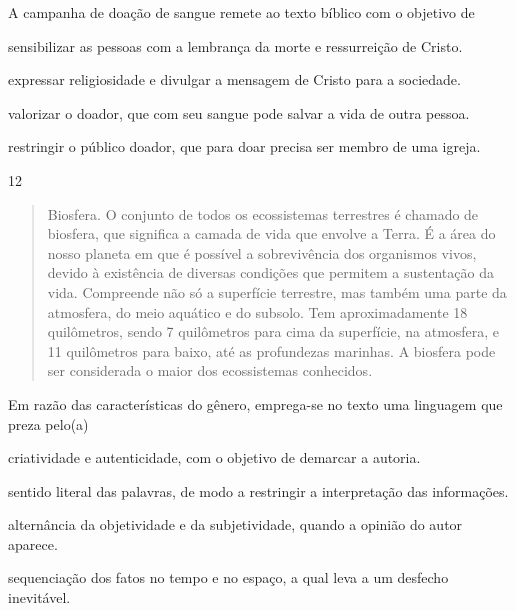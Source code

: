
A campanha de doação de sangue remete ao texto bíblico com o objetivo de

\begin{escolha}
\item sensibilizar as pessoas com a lembrança da morte e ressurreição de
Cristo.
\item expressar religiosidade e divulgar a mensagem de Cristo para a
sociedade.
\item valorizar o doador, que com seu sangue pode salvar a vida de outra
pessoa.
\item restringir o público doador, que para doar precisa ser membro de uma
igreja.
\end{escolha}

\num{12}

\begin{quote}
Biosfera. O conjunto de todos os ecossistemas terrestres é chamado de
biosfera, que significa a camada de vida que envolve a Terra. É a área
do nosso planeta em que é possível a sobrevivência dos organismos vivos,
devido à existência de diversas condições que permitem a sustentação da
vida. Compreende não só a superfície terrestre, mas também uma parte da
atmosfera, do meio aquático e do subsolo. Tem aproximadamente 18
quilômetros, sendo 7 quilômetros para cima da superfície, na atmosfera,
e 11 quilômetros para baixo, até as profundezas marinhas. A biosfera
pode ser considerada o maior dos ecossistemas conhecidos.
\end{quote}


Em razão das características do gênero, emprega-se no texto uma
linguagem que preza pelo(a)

\begin{escolha}
\item criatividade e autenticidade, com o objetivo de demarcar a autoria.

\item sentido literal das palavras, de modo a restringir a interpretação
das informações.

\item alternância da objetividade e da subjetividade, quando a opinião do
autor aparece.

\item sequenciação dos fatos no tempo e no espaço, a qual leva a um
desfecho inevitável.
\end{escolha}



